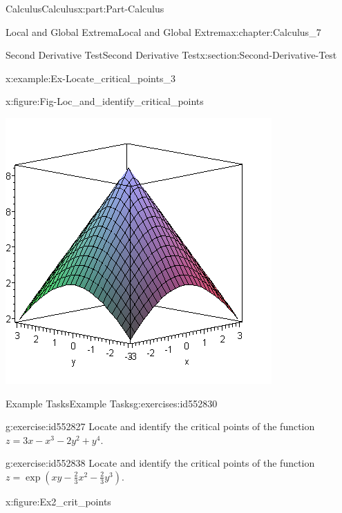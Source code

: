 \documentclass[oneside,10pt,]{book}
\numberwithin{equation}{section}
\begin{document}
\begin{partptx}{Calculus}{}{Calculus}{}{}{x:part:Part-Calculus}
\begin{chapterptx}{Local and Global Extrema}{}{Local and Global Extrema}{}{}{x:chapter:Calculus_7}
\begin{sectionptx}{Second Derivative Test}{}{Second Derivative Test}{}{}{x:section:Second-Derivative-Test}
\begin{example}{}{x:example:Ex-Locate_critical_points_3}
\begin{figureptx}{}{x:figure:Fig-Loc_and_identify_critical_points}{}
\begin{image}{0.15}{0.7}{0.15}
\includegraphics[width=\linewidth]{./Calculus/Images/7/Fig6_Loc_and_identify_critical_points.png}
\end{image}%
\tcblower
\end{figureptx}%
\end{example}
%
%
\typeout{************************************************}
\typeout{************************************************}
%
\begin{exercises-subsection-numberless}{Example Tasks}{}{Example Tasks}{}{}{g:exercises:id552830}
\begin{divisionexercise}{1}{}{}{g:exercise:id552827}%
Locate and identify the critical points of the function \(z=3x-x^3-2y^2+y^4\).%
\end{divisionexercise}%
\begin{divisionexercise}{2}{}{}{g:exercise:id552838}%
Locate and identify the critical points of the function \(z=\exp \left(xy-\frac{2}{3}x^2 - \frac{2}{3}y^3 \right)\).%
\begin{figureptx}{}{x:figure:Ex2_crit_points}{}%
\begin{image}{0.15}{0.7}{0.15}%

\end{image}
\end{figureptx}
\end{divisionexercise}
\end{exercises-subsection-numberless}
\end{sectionptx}
\end{chapterptx}
\end{partptx}
\end{document}
